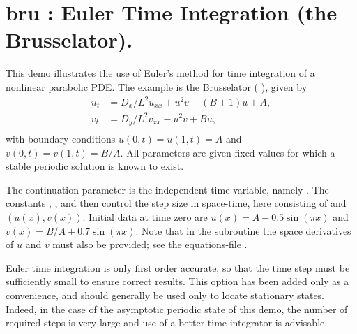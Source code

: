 \documentclass[12pt]{report}
\begin{document}
\newpage
\section{ bru : Euler Time Integration (the Brusselator).} \label{sec:Demos_bru}
This demo illustrates the use of Euler's method for time integration
of a nonlinear parabolic PDE.
The example is the Brusselator
( \citeyear{HoKnKu:87}), given by
\begin{equation} \begin{array}{cl}
  u_t &= {D_x / L^2} u_{xx} + u^2v - (B+1)u + A,  \\
  v_t &= {D_y / L^2} v_{xx} - u^2v + Bu,  \\
\end{array} \end{equation}
with boundary conditions $u(0,t)=u(1,t)=A$
and $v(0,t)=v(1,t)=B/A$. All parameters are given fixed values
for which a stable periodic solution is known to exist.

The continuation parameter is the independent time variable,
namely .
The \AUTO-constants , , and 
then control the step size
in space-time, here consisting of  and $(u(x),v(x))$.
Initial data at time zero are 
$u(x)=A - 0.5 \sin(\pi x)$ and 
$v(x)=B/A + 0.7 \sin(\pi x)$.
Note that in the subroutine  the space derivatives of $u$ and $v$
must also be provided; 
see the equations-file .

Euler time integration is only first order accurate, so that
the time step must be sufficiently small to ensure correct results.
This option has been added only as a convenience, and should 
generally be used only to locate stationary states.
Indeed, in the case of the asymptotic periodic state of this demo,
the number of required steps is very large and use of a better time 
integrator is advisable.
\end{document}
